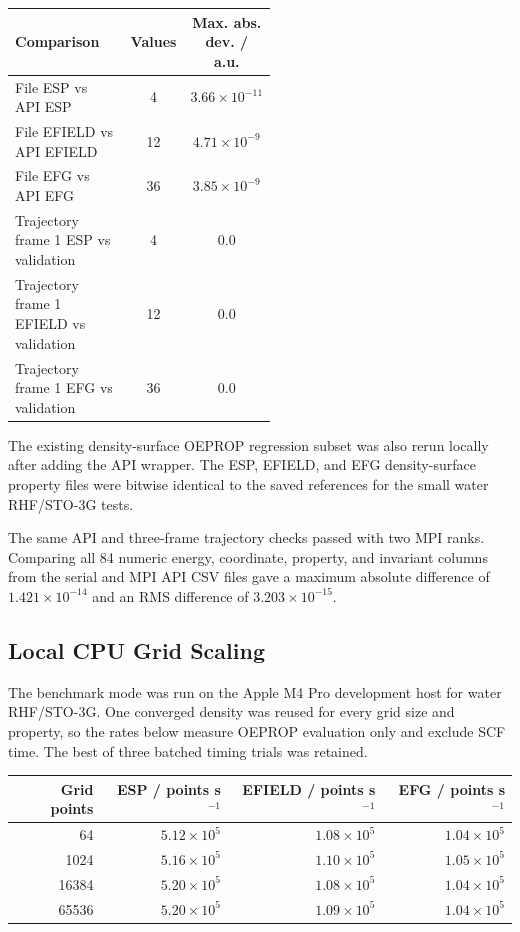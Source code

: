 \documentclass[journal=jcisd8,manuscript=suppinfo]{achemso}
\begin{document}
\begin{center}
\small
\begin{tabular}{p{0.52\linewidth}cc}
\toprule
Comparison & Values & Max. abs. dev. / a.u. \\
\midrule
File ESP vs API ESP & 4 & \(3.66\times10^{-11}\) \\
File EFIELD vs API EFIELD & 12 & \(4.71\times10^{-9}\) \\
File EFG vs API EFG & 36 & \(3.85\times10^{-9}\) \\
Trajectory frame 1 ESP vs validation & 4 & \(0.0\) \\
Trajectory frame 1 EFIELD vs validation & 12 & \(0.0\) \\
Trajectory frame 1 EFG vs validation & 36 & \(0.0\) \\
\bottomrule
\end{tabular}
\end{center}

The existing density-surface OEPROP regression subset was also rerun locally after adding the API wrapper.  The ESP, EFIELD, and EFG density-surface property files were bitwise identical to the saved references for the small water RHF/STO-3G tests.

The same API and three-frame trajectory checks passed with two MPI ranks.  Comparing all 84 numeric energy, coordinate, property, and invariant columns from the serial and MPI API CSV files gave a maximum absolute difference of \(1.421\times10^{-14}\) and an RMS difference of \(3.203\times10^{-15}\).

\subsection{Local CPU Grid Scaling}

The benchmark mode was run on the Apple M4 Pro development host for water RHF/STO-3G.  One converged density was reused for every grid size and property, so the rates below measure OEPROP evaluation only and exclude SCF time.  The best of three batched timing trials was retained.

\begin{center}
\small
\begin{tabular}{rrrr}
\toprule
Grid points & ESP / points s\(^{-1}\) & EFIELD / points s\(^{-1}\) & EFG / points s\(^{-1}\) \\
\midrule
64    & \(5.12\times10^5\) & \(1.08\times10^5\) & \(1.04\times10^5\) \\
1024  & \(5.16\times10^5\) & \(1.10\times10^5\) & \(1.05\times10^5\) \\
16384 & \(5.20\times10^5\) & \(1.08\times10^5\) & \(1.04\times10^5\) \\
65536 & \(5.20\times10^5\) & \(1.09\times10^5\) & \(1.04\times10^5\) \\
\bottomrule
\end{tabular}
\end{center}
\end{document}
